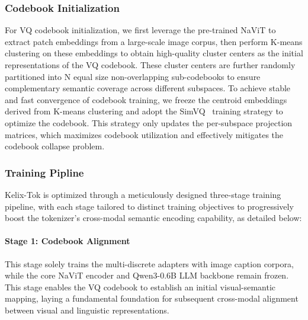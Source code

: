 \documentclass[11pt, a4paper, logo, copyright]{googledeepmind}
\begin{document}
\subsubsection{Codebook Initialization}
For VQ codebook initialization, we first leverage the pre-trained NaViT to extract patch embeddings from a large-scale image corpus, then perform K-means clustering on these embeddings to obtain high-quality cluster centers as the initial representations of the VQ codebook. These cluster centers are further randomly partitioned into N equal size non-overlapping sub-codebooks to ensure complementary semantic coverage across different subspaces. To achieve stable and fast convergence of codebook training, we freeze the centroid embeddings derived from K-means clustering and adopt the SimVQ~\citep{zhu2025addressing} training strategy to optimize the codebook. This strategy only updates the per-subspace projection matrices, which maximizes codebook utilization and effectively mitigates the codebook collapse problem.

\subsubsection{Training Pipline}
Kelix-Tok is optimized through a meticulously designed three-stage training pipeline, with each stage tailored to distinct training objectives to progressively boost the tokenizer's cross-modal semantic encoding capability, as detailed below:

\paragraph{Stage 1: Codebook Alignment} %
This stage solely trains the multi-discrete adapters with image caption corpora, while the core NaViT encoder and Qwen3-0.6B LLM backbone remain frozen. This stage enables the VQ codebook to establish an initial visual-semantic mapping, laying a fundamental foundation for subsequent cross-modal alignment between visual and linguistic representations.
\end{document}
